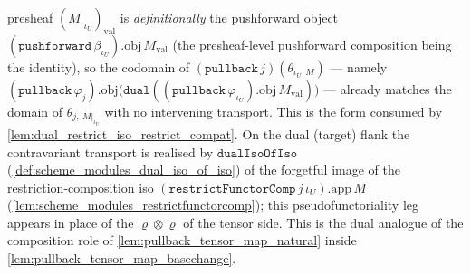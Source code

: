 \begin{lemma}
  presheaf \((M|_{\iota_U})_{\mathrm{val}}\) is \emph{definitionally} the pushforward object
  \((\mathtt{pushforward}\,\beta_{\iota_U}).\mathrm{obj}\,M_{\mathrm{val}}\) (the presheaf-level pushforward
  composition being the identity), so the codomain of \((\mathtt{pullback}\,j)(\theta_{\iota_U, M})\)
  --- namely
  \((\mathtt{pullback}\,\varphi_j).\mathrm{obj}\bigl(\mathtt{dual}((\mathtt{pullback}\,\varphi_{\iota_U}).\mathrm{obj}\,M_{\mathrm{val}})\bigr)\)
  --- already matches the domain of \(\theta_{j,\ M|_{\iota_U}}\) with no intervening transport. This is
  the form consumed by \cref{lem:dual_restrict_iso_restrict_compat}. On the dual (target) flank the
  contravariant transport is realised by \(\mathtt{dualIsoOfIso}\)
  (\cref{def:scheme_modules_dual_iso_of_iso}) of the forgetful image of the restriction-composition iso
  \((\mathtt{restrictFunctorComp}\,j\,\iota_U).\mathrm{app}\,M\)
  (\cref{lem:scheme_modules_restrictfunctorcomp}); this pseudofunctoriality leg appears in place of the
  \(\varrho \otimes \varrho\) of the tensor side. This is the dual analogue of the composition role of
  \cref{lem:pullback_tensor_map_natural} inside \cref{lem:pullback_tensor_map_basechange}.
\end{lemma}
